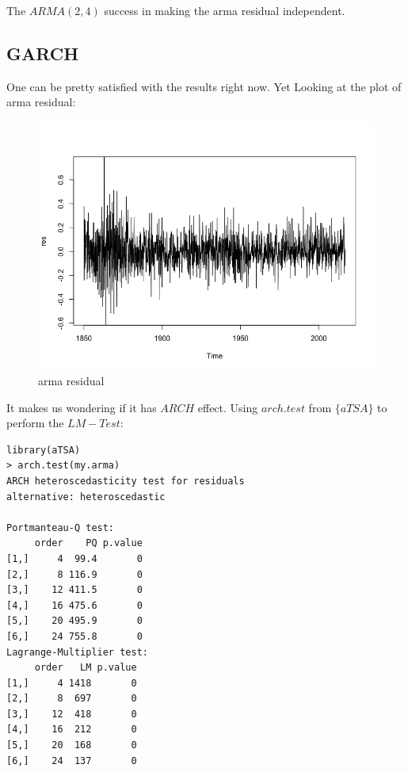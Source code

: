 \documentclass[a4paper, 11pt]{article}
\begin{document}
\indent The $ARMA(2, 4)$ success in making the arma residual independent. 


\subsection{GARCH}
One can be pretty satisfied with the results right now. Yet Looking at the plot of arma residual:
\begin{figure}[H]
\centering
\caption{arma residual}
\includegraphics[scale=.60]{armares.png}
\end{figure}

\indent It makes us wondering if it has $ARCH$ effect. Using $arch.test$ from $\{aTSA\}$ to perform the $LM-Test$:
\begin{verbatim}
library(aTSA)
> arch.test(my.arma)
ARCH heteroscedasticity test for residuals 
alternative: heteroscedastic 

Portmanteau-Q test: 
     order    PQ p.value
[1,]     4  99.4       0
[2,]     8 116.9       0
[3,]    12 411.5       0
[4,]    16 475.6       0
[5,]    20 495.9       0
[6,]    24 755.8       0
Lagrange-Multiplier test: 
     order   LM p.value
[1,]     4 1418       0
[2,]     8  697       0
[3,]    12  418       0
[4,]    16  212       0
[5,]    20  168       0
[6,]    24  137       0
\end{verbatim}
\end{document}

